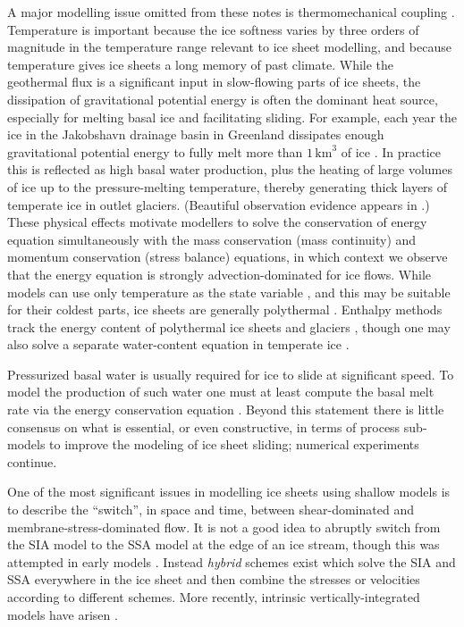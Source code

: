 \documentclass[letterpaper,final,12pt,reqno]{amsart}
\begin{document}
A major modelling issue omitted from these notes is thermomechanical coupling \cite{Blatteretal2010}.  Temperature is important because the ice softness varies by three orders of magnitude in the temperature range relevant to ice sheet modelling, and because temperature gives ice sheets a long memory of past climate.  While the geothermal flux is a significant input in slow-flowing parts of ice sheets, the dissipation of gravitational potential energy is often the dominant heat source, especially for melting basal ice and facilitating sliding.  For example, each year the ice in the Jakobshavn drainage basin in Greenland dissipates enough gravitational potential energy to fully melt more than $1\,\text{km}^3$ of ice \cite{AschwandenBuelerKhroulevBlatter}.  In practice this is reflected as high basal water production, plus the heating of large volumes of ice up to the pressure-melting temperature, thereby generating thick layers of temperate ice in outlet glaciers.  (Beautiful observation evidence appears in \cite{Luethietal2009}.)  These physical effects motivate modellers to solve the conservation of energy equation simultaneously with the mass conservation (mass continuity) and momentum conservation (stress balance) equations, in which context we observe that the energy equation is strongly advection-dominated \cite{Bueler2021} for ice flows.  While models can use only temperature as the state variable \cite{BBL}, and this may be suitable for their coldest parts, ice sheets are generally polythermal \cite{FowlerLarson1978,Greve}.  Enthalpy methods track the energy content of polythermal ice sheets and glaciers \cite{AschwandenBuelerKhroulevBlatter,GreveBlatter2016}, though one may also solve a separate water-content equation in temperate ice \cite{Greve}.

Pressurized basal water is usually required for ice to slide at significant speed.  To model the production of such water one must at least compute the basal melt rate via the energy conservation equation \cite{BBssasliding,BuelervanPelt2015,Clarke05,Raymondenergy,Tulaczyketal2000b}.  Beyond this statement there is little consensus on what is essential, or even constructive, in terms of process sub-models to improve the modeling of ice sheet sliding; numerical experiments continue.

One of the most significant issues in modelling ice sheets using shallow models is to describe the ``switch'', in space and time, between shear-dominated and membrane-stress-dominated flow.  It is not a good idea to abruptly switch from the SIA model to the SSA model at the edge of an ice stream, though this was attempted in early models \cite{HulbeMacAyeal,Ritzetal2001}.  Instead \emph{hybrid} schemes exist which solve the SIA and SSA everywhere in the ice sheet \cite{BBssasliding,PollardDeConto,Winkelmannetal2011} and then combine the stresses or velocities according to different schemes.  More recently, intrinsic vertically-integrated models have arisen \cite{BrinkerhoffJohnson2013,Goldberg2011}.
\end{document}

